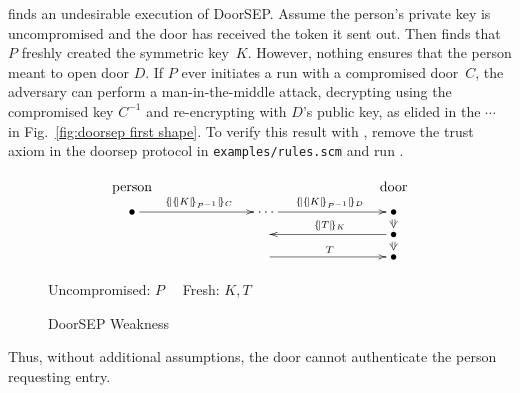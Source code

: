 
{\cpsa} finds an undesirable execution of DoorSEP.  Assume the
person's private key  is uncompromised and the door has received
the token it sent out.  Then {\cpsa} finds that~$P$ freshly created
the symmetric key~$K$.  However, nothing ensures that the person meant
to open door $D$.  If $P$ ever initiates a run with a compromised
door~$C$, the adversary can perform a man-in-the-middle attack,
decrypting using the compromised key $C^{-1}$ and re-encrypting with
$D$'s public key, as elided in the $\cdots$ in Fig.~\ref{fig:doorsep
  first shape}.  To verify this result with {\cpsa}, remove the trust
axiom in the doorsep protocol in \texttt{examples/rules.scm} and run
{\cpsa}.
%
\begin{figure}[tb]
  \[\xymatrix@R=2mm@C=7em{
    \txt{\strut person}&&\txt{\strut door}\\
    \bullet \ar[r]^{\enc{\enc{K}{\iv{P}}}{C}} & \cdots\ar[r]^{\enc{\enc{K}{\iv{P}}}{D}} &
    \bullet\ar@{=>}[d] \\
    & \null &   \bullet\ar@{=>}[d]\ar[l]_{\enc{T}{K}}\\
    &\null\ar[r]^T & \bullet}\]
  \begin{center}
    Uncompromised: $P\quad$ Fresh: $K, T$
  \end{center}
  \caption{DoorSEP Weakness}\label{fig:doorsep first shape}
\end{figure}
%
%
Thus, without additional assumptions, the door cannot authenticate the
person requesting entry.

